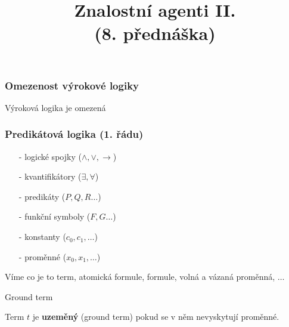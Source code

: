 \documentclass[red,professionalfont]{beamer}
\title[]{Znalostní agenti II.\\ (8. přednáška)}
\date[]{}
\theoremstyle{definition}
\newcommand{\0}{\mbox{${\bf 0}$}}
\renewcommand{\emph}[1]{{\bf #1}}
\begin{document}



\begin{frame}{} \titlepage
\end{frame}


% 

\begin{frame}\frametitle{Omezenost výrokové logiky}
\begin{center}
 Výroková logika je omezená
\end{center}
\end{frame}

\begin{frame}\frametitle{Predikátová logika (1. řádu)}
\begin{itemize}
 \item[-] logické spojky  ($\wedge,\vee,\rightarrow$)
 \item[-] kvantifikátory ($\exists,\forall$)
 \item[-] predikáty ($P,Q,R\ldots$)
 \item[-] funkční symboly ($F,G\ldots$)
 \item[-] konstanty ($c_0,c_1,\ldots$)
 \item[-] proměnné ($x_0,x_1,\ldots$)
\end{itemize}\pause
Víme co je to term\pause, atomická formule\pause, formule\pause, volná a vázaná proměnná\pause, $\ldots$\pause
\begin{block}{}
\begin{center}
Ground term
\end{center}
\end{block}\pause
Term $t$ je \emph{uzeměný} (ground term) pokud se v něm nevyskytují proměnné.
\end{frame}
\end{document}

